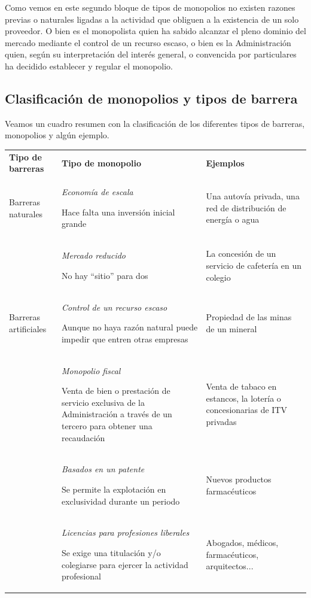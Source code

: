 \documentclass[
]{article}
\begin{document}
Como vemos en este segundo bloque de tipos de monopolios no existen
razones previas o naturales ligadas a la actividad que obliguen a la
existencia de un solo proveedor. O bien es el monopolista quien ha
sabido alcanzar el pleno dominio del mercado mediante el control de un
recurso escaso, o bien es la Administración quien, según su
interpretación del interés general, o convencida por particulares ha
decidido establecer y regular el monopolio.

\hypertarget{clasificaciuxf3n-de-monopolios-y-tipos-de-barrera}{%
\subsection{Clasificación de monopolios y tipos de
barrera}\label{clasificaciuxf3n-de-monopolios-y-tipos-de-barrera}}

Veamos un cuadro resumen con la clasificación de los diferentes tipos de
barreras, monopolios y algún ejemplo.

\begin{longtable}[]{@{}
  >{\raggedright\arraybackslash}p{}
  >{\raggedright\arraybackslash}p{}
  >{\raggedright\arraybackslash}p{}@{}}
\toprule\noalign{}
\endhead
\bottomrule\noalign{}
\endlastfoot
\textbf{Tipo de barreras} & \textbf{Tipo de monopolio} &
\textbf{Ejemplos} \\
Barreras naturales & \emph{Economía de escala}

Hace falta una inversión inicial grande & Una autovía privada, una red
de distribución de energía o agua \\
& \emph{Mercado reducido}

No hay ``sitio'' para dos & La concesión de un servicio de cafetería en
un colegio \\
Barreras artificiales & \emph{Control de un recurso escaso}

Aunque no haya razón natural puede impedir que entren otras empresas &
Propiedad de las minas de un mineral \\
& \emph{Monopolio fiscal}

Venta de bien o prestación de servicio exclusiva de la Administración a
través de un tercero para obtener una recaudación & Venta de tabaco en
estancos, la lotería o concesionarias de ITV privadas \\
& \emph{Basados en un patente}

Se permite la explotación en exclusividad durante un periodo & Nuevos
productos farmacéuticos \\
& \emph{Licencias para profesiones liberales}

Se exige una titulación y/o colegiarse para ejercer la actividad
profesional & Abogados, médicos, farmacéuticos, arquitectos... \\
\end{longtable}
\end{document}
